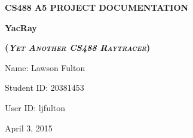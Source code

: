 \documentclass {article}
\begin{document}
%
%









%

\begin{center}
\Large

\textbf{\MakeUppercase{CS488 A5 Project Documentation}}
\vfill  

{
\Huge
\textbf{YacRay}
}

 {
        \Large
	\textsc{\textbf{(\textit{Yet Another CS488 Raytracer})}}
 }

\vfill
Name: Lawson Fulton

Student ID: 20381453

User ID: ljfulton

April 3, 2015
\end{center}
\end{document}

